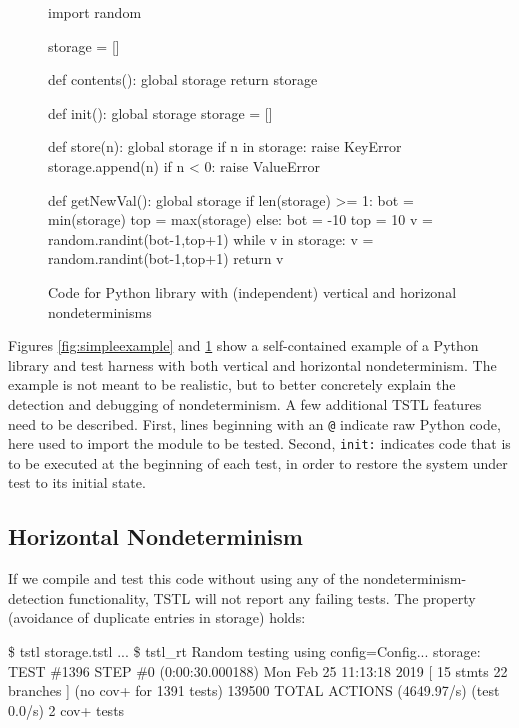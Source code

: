 \begin{figure}[t]
  {\scriptsize
\begin{code}
import random

storage = []

def contents():
    global storage
    return storage

def init():
    global storage
    storage = []

def store(n):
    global storage
    if n in storage:
       raise KeyError
    storage.append(n)
    if n < 0:
       raise ValueError

def getNewVal():
    global storage
    if len(storage) >= 1:
        bot = min(storage)
        top = max(storage)
    else:
        bot = -10
        top = 10
    v = random.randint(bot-1,top+1)
    while v in storage:
        v = random.randint(bot-1,top+1)
    return v
  \end{code}
  }
\caption{Code for Python library with (independent) vertical and
  horizonal nondeterminisms}
\label{fig:simpleexamplecode}
\end{figure}

Figures \ref{fig:simpleexample} and \ref{fig:simpleexamplecode} show a self-contained example of a
Python library and test harness with both vertical and horizontal
nondeterminism.  The example is not meant to be realistic, but to
better concretely explain the detection and debugging of
nondeterminism.  A few additional TSTL features need to be described.
First, lines beginning with an {\tt @} indicate raw Python code, here
used to import the module to be tested.  Second, {\tt init:} indicates
code that is to be executed at the beginning of each test, in
order to restore the system under test to its initial state.

\subsection{Horizontal Nondeterminism}

If we compile and test this code without using any of the
nondeterminism-detection functionality, TSTL will not report any
failing tests.  The property (avoidance of duplicate entries in
storage) holds:

{\scriptsize
\begin{code}
 \$ tstl storage.tstl
 ...
 \$ tstl\_rt
 Random testing using config=Config...
 storage: TEST \#1396 STEP \#0 (0:00:30.000188) Mon Feb
 25 11:13:18 2019 [ 15 stmts 22 branches ] (no cov+ for
 1391 tests) 139500 TOTAL ACTIONS (4649.97/s) (test
 0.0/s) 2 cov+ tests
\end{code}
}

